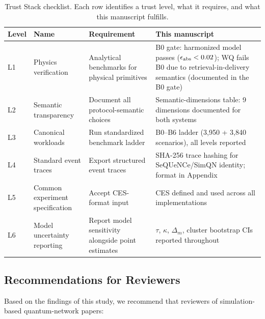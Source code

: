\documentclass{ams-journal}
\begin{document}
\begin{table}[t]
\centering
\caption{Trust Stack checklist. Each row identifies a trust level, what it requires, and what this manuscript fulfills.}
\label{tab:truststack}
\small
\begin{tabularx}{\textwidth}{p{1.2cm}p{3.5cm}p{4cm}p{4cm}}
\toprule
Level & Name & Requirement & This manuscript \\
\midrule
L1 & Physics verification & Analytical benchmarks for physical primitives & B0 gate: harmonized model passes ($\epsilon_{\rm abs} < 0.02$); WQ fails B0 due to retrieval-in-delivery semantics (documented in the B0 gate) \\
L2 & Semantic transparency & Document all protocol-semantic choices & Semantic-dimensions table: 9 dimensions documented for both systems \\
L3 & Canonical workloads & Run standardized benchmark ladder & B0--B6 ladder (3,950 + 3,840 scenarios), all levels reported \\
L4 & Standard event traces & Export structured event traces & SHA-256 trace hashing for SeQUeNCe/SimQN identity; format in Appendix \\
L5 & Common experiment specification & Accept CES-format input & CES defined and used across all implementations \\
L6 & Model uncertainty reporting & Report model sensitivity alongside point estimates & $\tau$, $\kappa$, $\Delta_m$, cluster bootstrap CIs reported throughout \\
\bottomrule
\end{tabularx}
\end{table}

\subsection{Recommendations for Reviewers}

Based on the findings of this study, we recommend that reviewers of simulation-based quantum-network papers:
\end{document}
